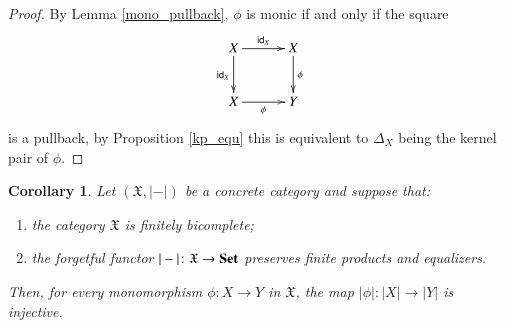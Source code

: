 \documentclass[12pt]{article}
\newtheorem{corollary}[lemma]{Corollary}
\theoremstyle{definition}
\def\X{\mathfrak X}
\newcommand{\Set}{\textbf{\textup{Set}}}
\numberwithin{equation}{section}
\newcommand{\id}[1]{\mathsf{id}_{#1}}
\begin{document}
\begin{proof}
	By Lemma \ref{mono_pullback}, $\phi$ is monic if and only if the square
	\[
	\xymatrix@R=10pt@C=30pt{
		X\ar@{}[ddr]\ar[dd]_{\id{X}}\ar[r]^{\id{X}}&X\ar[dd]^\phi\\
		\\
		X\ar[r]_\phi&Y
	}
	\]
	is a pullback, by Proposition \ref{kp_equ} this is equivalent to $\Delta_X$ being the kernel pair of $\phi$.\qedhere 
	
	
	\iffalse 
	
(1)$\Rightarrow$(2).
Let $(X\times X, (\pi_i)_{i=1,2})$ be the product of two copies of $X$. By Lemma \ref{easy_lemma_monos_and_eq}, whenever $\phi$ is a monomorphism, the equalizer of the maps $\phi\circ \pi_1$ and $\phi\circ \pi_2$ (that is, the kernel pair of $\phi$) is the same as the equalizer of the maps $\pi_1$ and $\pi_2$, that is, $\Delta_X\colon X\to X\times X$ (see Example \ref{ex_eq_of_projections})

\smallskip\noindent
(2)$\Rightarrow$(1). If $\Delta_X\colon X\to X\times X$ is the kernel pair of $\phi$ then the square


is a pullback and we can conclude using Lemma \ref{mono_pullback}.
Let $(X\times X, (\pi_i)_{i=1,2})$ be the product of two copies of $X$, suppose that  $\Delta_X\colon X\to X\times X$ is the kernel pair of $\phi$ and take two maps $f,\, g\colon Z\rightrightarrows X$ such that $\phi\circ f=\phi\circ g$, as in the following diagram
\[
\xymatrix@R=30pt@C=50pt{
X\ar[r]^{\Delta_X}&X\times X\ar@<-.5ex>[r]_-{\pi_1} \ar@<.5ex>[r]^-{\pi_2}&X\ar[r]^\phi&Y\\
&Z\ar@{.>}[lu]^{\exists!h'}\ar@{.>}[u]^{\exists!h}\ar@<-.5ex>[ur]_(.4){f} \ar@<.5ex>[ur]^(.4){g}}.
\]
By the universal property of the product, there exists a unique map $h\colon Z\to X\times X$ such that $\pi_1\circ h=f$ and $\pi_2\circ h=g$. On the other hand, we have the following equality: 
\[
\phi\circ\pi_1\circ h=\phi\circ f=\phi\circ g=\phi\circ \pi_2\circ h
\]
that, by the universal property of the equalizer, implies that there exists a unique map $h'\colon Z\to X$ such that $h=\Delta_X\circ h'$. To conclude just note that, since $\pi_i\circ \Delta_X=\id {X}$,
\[
f=\pi_1\circ h=\pi_1\circ \Delta_X\circ h'=\id X\circ h'=\pi_2\circ \Delta_X\circ h'=\pi_2\circ h=g.
\qedhere
\]
\fi 
\end{proof}
\begin{corollary}\label{mono_is_injective}
	Let $(\X,|-|)$ be a concrete category and suppose that:
	\begin{enumerate}[\rm (1)]
		\item the category $\X$ is finitely bicomplete; 
		\item the forgetful functor $|-|\colon \X\to \Set$ preserves finite products and equalizers.
	\end{enumerate}
	Then, for every monomorphism $\phi\colon X\to Y$ in $\X$, the map $|\phi|\colon |X|\to |Y|$ is injective.
\end{corollary}
\end{document}
